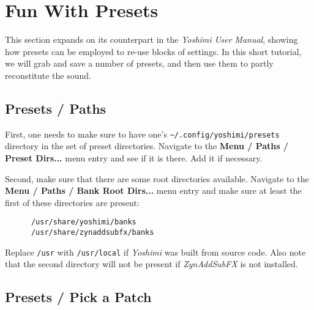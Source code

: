 %
%
%

\section{Fun With Presets}
\label{sec:presets}

   This section expands on its counterpart in the  \textsl{Yoshimi User Manual},
   showing how presets can be employed to re-use blocks of settings.
   In this short tutorial, we will grab and save a number of presets,
   and then use them to partly reconstitute the sound.

\subsection{Presets / Paths}
\label{subsec:presets_paths}

   First, one needs to make sure to have one's
   \texttt{\textasciitilde/.config/yoshimi/presets} directory
   in the set of preset directories.
   Navigate to the \textbf{Menu / Paths / Preset Dirs...} menu entry
   and see if it is there.
   Add it if necessary.

   Second, make sure that there are some root directories available.
   Navigate to the \textbf{Menu / Paths / Bank Root Dirs...} menu entry
   and make sure at least the first of these directories are present:

   \begin{verbatim}
      /usr/share/yoshimi/banks
      /usr/share/zynaddsubfx/banks
   \end{verbatim}

   Replace \texttt{/usr} with \texttt{/usr/local} if \textsl{Yoshimi}
   was built from source code.  Also note that the second directory will not
   be present if \textsl{ZynAddSubFX} is not installed.

\subsection{Presets / Pick a Patch}
\label{subsec:presets_pick_a_patch}

